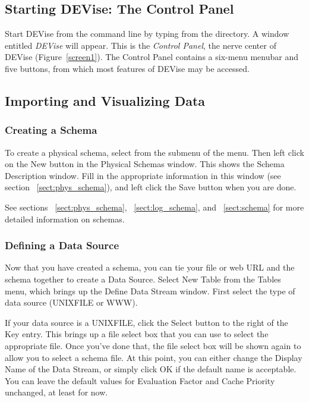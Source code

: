 
\subsection{Starting DEVise: The Control Panel}

Start DEVise from the command line by typing  from the
 directory. A window entitled {\em DEVise} will appear. This is
the {\em Control Panel}, the nerve center of DEVise (Figure~\ref{screen1}). The
Control Panel contains a six-menu menubar and five buttons, from which most
features of DEVise may be accessed.



\subsection{Importing and Visualizing Data}

\subsubsection{Creating a Schema}

To create a physical schema, select  from the 
submenu of the  menu.  Then left click on the New button in the
Physical Schemas window.  This shows the Schema Description window.  Fill in
the appropriate information in this window
(see section ~\ref{sect:phys_schema}), and left click the Save button when
you are done.

See sections ~\ref{sect:phys_schema}, ~\ref{sect:log_schema},
and ~\ref{sect:schema} for more detailed information on schemas.

\subsubsection{Defining a Data Source}

Now that you have created a schema, you can tie your file or web URL and the
schema together to create a Data Source.  Select New Table from the Tables
menu, which brings up the Define Data Stream window.  First select the type of
data source (UNIXFILE or WWW).

If your data source is a UNIXFILE, click the Select button to the right of
the Key entry.  This brings up a file select box that you can use to select
the appropriate file.  Once you've done that, the file select box will be
shown again to allow you to select a schema file.  At this point, you can
either change the Display Name of the Data Stream, or simply click OK if
the default name is acceptable.  You can leave the default values
for Evaluation Factor and Cache Priority unchanged, at least for now.

